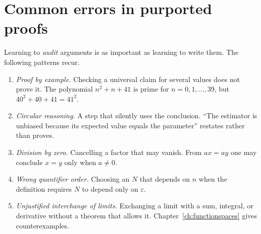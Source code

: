 \section{Common errors in purported proofs}
Learning to \emph{audit} arguments is as important as learning to write them. The following patterns recur.
\begin{enumerate}[leftmargin=2em]
\item \emph{Proof by example.} Checking a universal claim for several values does not prove it. The polynomial $n^2+n+41$ is prime for $n=0,1,\ldots,39$, but $40^2+40+41=41^2$.
\item \emph{Circular reasoning.} A step that silently uses the conclusion. ``The estimator is unbiased because its expected value equals the parameter'' restates rather than proves.
\item \emph{Division by zero.} Cancelling a factor that may vanish. From $ax=ay$ one may conclude $x=y$ only when $a\ne0$.
\item \emph{Wrong quantifier order.} Choosing an $N$ that depends on $n$ when the definition requires $N$ to depend only on $\varepsilon$.
\item \emph{Unjustified interchange of limits.} Exchanging a limit with a sum, integral, or derivative without a theorem that allows it. Chapter~\ref{ch:functionspaces} gives counterexamples.
\end{enumerate}


